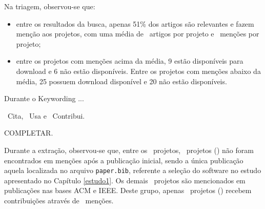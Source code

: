 
Na triagem, observou-se que:
\begin{itemize}
\item entre os resultados da busca, apenas 51\% dos artigos são relevantes e fazem
menção aos projetos, com uma média de \ScreeningUniqueMean \ artigos por projeto
e \ScreeningMean \ menções por projeto;

\item entre os projetos com menções acima da média, 9 estão disponíveis para download
e 6 não estão disponíveis. Entre os projetos com menções abaixo da média, 25
possuem download disponível e 20 não estão disponíveis.
\end{itemize}




Durante o Keywording ...

\CiteCount \ Cita,
\UseCount \ Usa e
\ContributeCount \ Contribui.

COMPLETAR.



Durante a extração, observou-se que, 
entre os \SoftwareCount \ projetos, \SoftwareNotMentionedCount \ projetos
() não foram encontrados em menções
após a publicação inicial, sendo a única publicação aquela localizada no
arquivo \texttt{paper.bib}, referente a seleção do software no estudo
apresentado no Capítulo \ref{estudo1}.
%
Os demais \MentionsStudyDois \ projetos são mencionados em publicações nas
bases ACM e IEEE. Deste grupo, apenas \ContributeStudyDoisSoftware \ projetos
() recebem contribuições através de
\ContributeStudyDoisCount \ menções.

